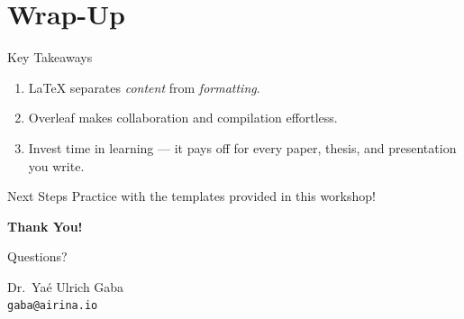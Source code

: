 \documentclass[aspectratio=169]{beamer}
\begin{document}
\section{Wrap-Up}

\begin{frame}{Key Takeaways}
    \begin{enumerate}
        \item \LaTeX{} separates \emph{content} from \emph{formatting}.
        \item Overleaf makes collaboration and compilation effortless.
        \item Invest time in learning — it pays off for every paper, thesis,
              and presentation you write.
    \end{enumerate}

    \vspace{1em}
    \begin{alertblock}{Next Steps}
        Practice with the templates provided in this workshop!
    \end{alertblock}
\end{frame}

\begin{frame}{}
    \centering
    \vfill
    {\Huge\bfseries Thank You!}

    \vspace{1.5em}
    {\large Questions?}

    \vspace{1.5em}
    {\normalsize
        Dr.\ Ya\'{e} Ulrich Gaba \\
        \texttt{gaba@airina.io}
    }
    \vfill
\end{frame}
\end{document}
